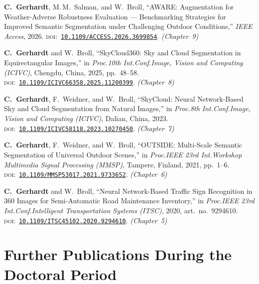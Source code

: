 \documentclass[11pt,a4paper]{article}
\newcommand{\doilink}[1]{\textsc{doi:}~\href{https://doi.org/#1}{\nolinkurl{#1}}}
\begin{document}
\begin{enumerate}[label={[\arabic*]}, leftmargin=2.5em, itemsep=6pt]

\item \textbf{C.~Gerhardt}, M.\,M.~Salman, and W.~Broll,
``{AWARE}: Augmentation for Weather-Adverse Robustness Evaluation --- Benchmarking Strategies for Improved Semantic Segmentation under Challenging Outdoor Conditions,''
\emph{IEEE Access}, 2026.
\doilink{10.1109/ACCESS.2026.3699854}.
\hfill\textit{(Chapter~9)}

\item \textbf{C.~Gerhardt} and W.~Broll,
``{SkyCloud360}: Sky and Cloud Segmentation in Equirectangular Images,''
in \emph{Proc.\@ 10th Int.\@ Conf.\@ Image, Vision and Computing (ICIVC)},
Chengdu, China, 2025, pp.~48--58.
\doilink{10.1109/ICIVC66358.2025.11200399}.
\hfill\textit{(Chapter~8)}

\item \textbf{C.~Gerhardt}, F.~Weidner, and W.~Broll,
``{SkyCloud}: Neural Network-Based Sky and Cloud Segmentation from Natural Images,''
in \emph{Proc.\@ 8th Int.\@ Conf.\@ Image, Vision and Computing (ICIVC)},
Dalian, China, 2023.
\doilink{10.1109/ICIVC58118.2023.10270450}.
\hfill\textit{(Chapter~7)}

\item \textbf{C.~Gerhardt}, F.~Weidner, and W.~Broll,
``{OUTSIDE}: Multi-Scale Semantic Segmentation of Universal Outdoor Scenes,''
in \emph{Proc.\@ IEEE 23rd Int.\@ Workshop Multimedia Signal Processing (MMSP)},
Tampere, Finland, 2021, pp.~1--6.
\doilink{10.1109/MMSP53017.2021.9733652}.
\hfill\textit{(Chapter~6)}

\item \textbf{C.~Gerhardt} and W.~Broll,
``Neural Network-Based Traffic Sign Recognition in 360\textdegree{} Images for Semi-Automatic Road Maintenance Inventory,''
in \emph{Proc.\@ IEEE 23rd Int.\@ Conf.\@ Intelligent Transportation Systems (ITSC)},
2020, art.~no.~9294610.
\doilink{10.1109/ITSC45102.2020.9294610}.
\hfill\textit{(Chapter~5)}

\end{enumerate}

\section*{Further Publications During the Doctoral Period}
\end{document}
